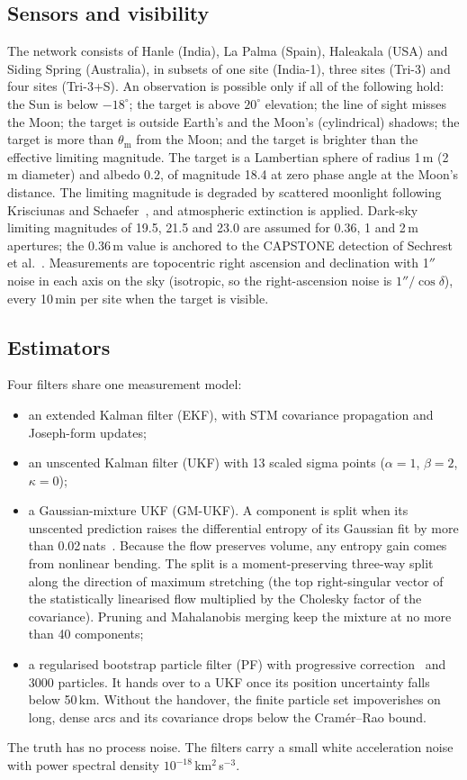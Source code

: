 \documentclass[pdflatex,sn-mathphys-num]{sn-jnl}
\begin{document}
\subsection{Sensors and visibility}\label{sec:sensors}
The network consists of Hanle (India), La Palma (Spain), Haleakala (USA) and Siding Spring
(Australia), in subsets of one site (India-1), three sites (Tri-3) and four sites (Tri-3+S). An
observation is possible only if all of the following hold: the Sun is below $-18^\circ$; the target
is above $20^\circ$ elevation; the line of sight misses the Moon; the target is outside Earth's and
the Moon's (cylindrical) shadows; the target is more than $\theta_{\mathrm{m}}$ from the Moon; and
the target is brighter than the effective limiting magnitude. The target is a Lambertian sphere of
radius 1\,m (2\,m diameter) and albedo 0.2, of magnitude 18.4 at zero phase angle at the Moon's
distance. The limiting magnitude is degraded by scattered moonlight following Krisciunas and
Schaefer~\cite{krisciunas1991}, and atmospheric extinction is applied. Dark-sky limiting magnitudes
of 19.5, 21.5 and 23.0 are assumed for 0.36, 1 and 2\,m apertures; the 0.36\,m value is anchored to
the CAPSTONE detection of Sechrest et al.~\cite{sechrest2024}. Measurements are topocentric right
ascension and declination with 1$''$ noise in each axis on the sky (isotropic, so the
right-ascension noise is $1''/\cos\delta$), every 10\,min per site when the target is visible.

\subsection{Estimators}\label{sec:estimators}
Four filters share one measurement model:
\begin{itemize}
\item an extended Kalman filter (EKF), with STM covariance propagation and Joseph-form updates;
\item an unscented Kalman filter (UKF) with 13 scaled sigma points ($\alpha=1$, $\beta=2$,
      $\kappa=0$);
\item a Gaussian-mixture UKF (GM-UKF). A component is split when its unscented prediction raises
      the differential entropy of its Gaussian fit by more than 0.02\,nats~\cite{demars2013}.
      Because the flow preserves volume, any entropy gain comes from nonlinear bending. The split
      is a moment-preserving three-way split along the direction of maximum stretching (the top
      right-singular vector of the statistically linearised flow multiplied by the Cholesky factor
      of the covariance). Pruning and Mahalanobis merging keep the mixture at no more than 40
      components;
\item a regularised bootstrap particle filter (PF) with progressive
      correction~\cite{oudjane2000,musso2001} and 3000 particles. It hands over to a UKF once its
      position uncertainty falls below 50\,km. Without the handover, the finite particle set
      impoverishes on long, dense arcs and its covariance drops below the Cram\'er--Rao bound.
\end{itemize}
The truth has no process noise. The filters carry a small white acceleration noise with power
spectral density $10^{-18}$\,km$^2$\,s$^{-3}$.
\end{document}
